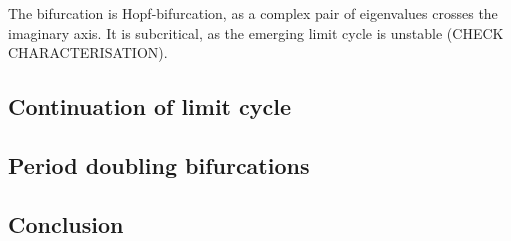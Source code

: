 The bifurcation is Hopf-bifurcation, as a complex pair of eigenvalues crosses the imaginary axis. It is subcritical,
as the emerging limit cycle is unstable (CHECK CHARACTERISATION). 


\subsection{Continuation of limit cycle}

\subsection{Period doubling bifurcations}

\subsection{Conclusion}
